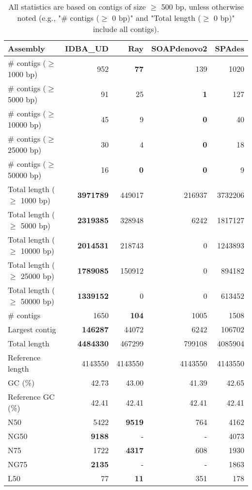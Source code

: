 \documentclass[12pt,a4paper]{article}
\begin{document}
\begin{table}[ht]
\begin{center}
\caption{All statistics are based on contigs of size $\geq$ 500 bp, unless otherwise noted (e.g., "\# contigs ($\geq$ 0 bp)" and "Total length ($\geq$ 0 bp)" include all contigs).}
\begin{tabular}{|l*{4}{|r}|}
\hline
Assembly & IDBA\_UD & Ray & SOAPdenovo2 & SPAdes \\ \hline
\# contigs ($\geq$ 1000 bp) & 952 & {\bf 77} & 139 & 1020 \\ \hline
\# contigs ($\geq$ 5000 bp) & 91 & 25 & {\bf 1} & 127 \\ \hline
\# contigs ($\geq$ 10000 bp) & 45 & 9 & {\bf 0} & 40 \\ \hline
\# contigs ($\geq$ 25000 bp) & 30 & 4 & {\bf 0} & 18 \\ \hline
\# contigs ($\geq$ 50000 bp) & 16 & {\bf 0} & {\bf 0} & 9 \\ \hline
Total length ($\geq$ 1000 bp) & {\bf 3971789} & 449017 & 216937 & 3732206 \\ \hline
Total length ($\geq$ 5000 bp) & {\bf 2319385} & 328948 & 6242 & 1817127 \\ \hline
Total length ($\geq$ 10000 bp) & {\bf 2014531} & 218743 & 0 & 1243893 \\ \hline
Total length ($\geq$ 25000 bp) & {\bf 1789085} & 150912 & 0 & 894182 \\ \hline
Total length ($\geq$ 50000 bp) & {\bf 1339152} & 0 & 0 & 613452 \\ \hline
\# contigs & 1650 & {\bf 104} & 1005 & 1508 \\ \hline
Largest contig & {\bf 146287} & 44072 & 6242 & 106702 \\ \hline
Total length & {\bf 4484330} & 467299 & 799108 & 4085904 \\ \hline
Reference length & 4143550 & 4143550 & 4143550 & 4143550 \\ \hline
GC (\%) & 42.73 & 43.00 & 41.39 & 42.65 \\ \hline
Reference GC (\%) & 42.41 & 42.41 & 42.41 & 42.41 \\ \hline
N50 & 5422 & {\bf 9519} & 764 & 4162 \\ \hline
NG50 & {\bf 9188} & - & - & 4073 \\ \hline
N75 & 1722 & {\bf 4317} & 608 & 1930 \\ \hline
NG75 & {\bf 2135} & - & - & 1863 \\ \hline
L50 & 77 & {\bf 11} & 351 & 178 \\ \hline

\end{tabular}
\end{center}
\end{table}
\end{document}
